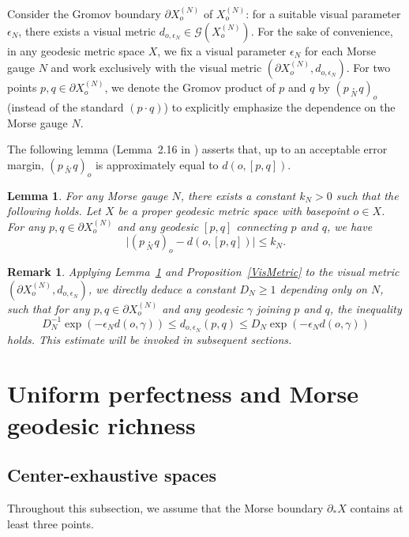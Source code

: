 \documentclass[a4paper,11pt,oneside]{article}
\newtheorem{Lemma}[Theorem]{Lemma}
\newtheorem{Remark}[Theorem]{Remark}
\begin{document}
Consider the Gromov boundary $\partial X_o^{(N)}$ of $X_o^{(N)}$: for a suitable visual parameter $\epsilon_N$, there exists a visual metric $d_{o,\epsilon_N}\in \mathcal{G}(X_o^{(N)})$. For the sake of convenience, in any geodesic metric space $X$, we fix a visual parameter $\epsilon_N$ for each Morse gauge $N$ and work exclusively with the visual metric $(\partial X_o^{(N)}, d_{o, \epsilon_N})$. 
For two points $p,q\in \partial X_o^{(N)}$, we denote the Gromov product of $p$ and $q$ by $(p\underset{N}{\cdot} q)_{o}$ (instead of the standard $(p\cdot q)$) to explicitly emphasize the dependence on the Morse gauge $N$.  

The following lemma (Lemma~2.16 in \cite{Liu22}) asserts that, up to an acceptable error margin, $(p\underset{N}{\cdot}q)_o$ is approximately equal to $d(o, [p, q])$.

\begin{Lemma}\label{Gp-dis}
    For any Morse gauge $N$, there exists a constant $k_N>0$ such that the following holds.
    Let $X$ be a proper geodesic metric space with basepoint $o\in X$. For any $p, q\in \partial X_o^{(N)}$ and any geodesic $[p, q]$ connecting $p$ and $q$, we have 
    $$\bigl|(p\underset{N}{\cdot}q)_o-d(o,[p,q])\bigr|\le k_N.$$
\end{Lemma}

\begin{Remark}\label{dis}
    Applying Lemma~\ref{Gp-dis} and Proposition~\ref{VisMetric} to the visual metric $(\partial X_o^{(N)}, d_{o, \epsilon_N})$, 
    we directly deduce a constant $D_N\ge 1$ depending only on $N$, such that for any $p, q\in \partial X_o^{(N)}$ and any geodesic $\gamma$ joining $p$ and $q$, 
    the inequality
    \[D_N^{-1}\exp{(-\epsilon_Nd(o, \gamma))}\le d_{o, \epsilon_{N}}(p,q)\le D_N\exp{(-\epsilon_Nd(o, \gamma))}\]
    holds. This estimate will be invoked in subsequent sections.
\end{Remark}


\section{Uniform perfectness and Morse geodesic richness}
\subsection{Center-exhaustive spaces}

Throughout this subsection, we assume that the Morse boundary $\partial_*X$ contains at least three points.
\end{document}
